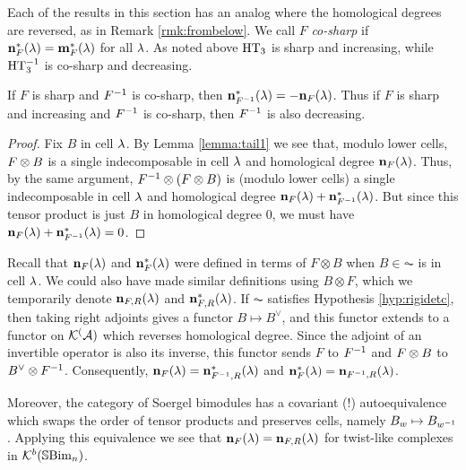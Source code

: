 Each of the results in this section has an analog where the homological degrees are reversed, as in Remark \ref{rmk:frombelow}. We call $F$ \emph{co-sharp} if ${\mathbf n}^\ast_F(\lambda) =
{\mathbf m}^\ast_F(\lambda)$ for all $\lambda$. As noted above $\operatorname{HT}_3$ is sharp and increasing, while $\operatorname{HT}_3^{-1}$ is co-sharp and decreasing.

\begin{lemma} If $F$ is sharp and $F^{-1}$ is co-sharp, then ${\mathbf n}^\ast_{F^{-1}}(\lambda) = -{\mathbf n}_F(\lambda)$. Thus if $F$ is sharp and increasing and $F^{-1}$ is co-sharp, then $F^{-1}$ is also
decreasing. \end{lemma}

\begin{proof} Fix $B$ in cell $\lambda$. By Lemma \ref{lemma:tail1} we see that, modulo lower cells, $F \otimes B$ is a single indecomposable in cell $\lambda$ and homological degree ${\mathbf n}_F(\lambda)$.
Thus, by the same argument, $F^{-1} \otimes (F \otimes B)$ is (modulo lower cells) a single indecomposable in cell $\lambda$ and homological degree ${\mathbf n}_F(\lambda) + {\mathbf n}^\ast_{F^{-1}}(\lambda)$. But since this
tensor product is just $B$ in homological degree $0$, we must have ${\mathbf n}_F(\lambda) + {\mathbf n}^\ast_{F^{-1}}(\lambda) = 0$. \end{proof}


\begin{remark} Recall that ${\mathbf n}_F(\lambda)$ and ${\mathbf n}_F^\ast(\lambda)$ were defined in terms of $F\otimes B$ when $B\in\AC$ is in cell $\lambda$.  We could also have made similar definitions using $B\otimes F$, which we temporarily denote ${\mathbf n}_{F,R}(\lambda)$ and ${\mathbf n}_{F,R}^\ast(\lambda)$.  If $\AC$ satisfies Hypothesis \ref{hyp:rigidetc}, then taking right adjoints gives a functor $B \mapsto B^\vee$, and this functor extends to a functor on ${\mathcal{K}}^({\mathcal{A}})$ which reverses homological degree. Since the adjoint of an invertible operator is also its inverse, this functor sends $F$ to $F^{-1}$ and $F \otimes B$ to $B^\vee \otimes F^{-1}$. Consequently, ${\mathbf n}_F(\lambda) = {\mathbf n}^\ast_{F^{-1},R}(\lambda)$ and ${\mathbf n}_F^\ast(\lambda) = {\mathbf n}_{F^{-1},R}(\lambda)$.

Moreover, the category of Soergel bimodules has a covariant (!) autoequivalence which swaps the order of tensor products and preserves cells, namely $B_w\mapsto B_{w^{-1}}$. Applying this equivalence we see that ${\mathbf n}_F(\lambda) = {\mathbf n}_{F,R}(\lambda)$ for twist-like complexes in ${\mathcal{K}}^b({\mathbb{S}}{\rm Bim }_n)$.
\end{remark}  


